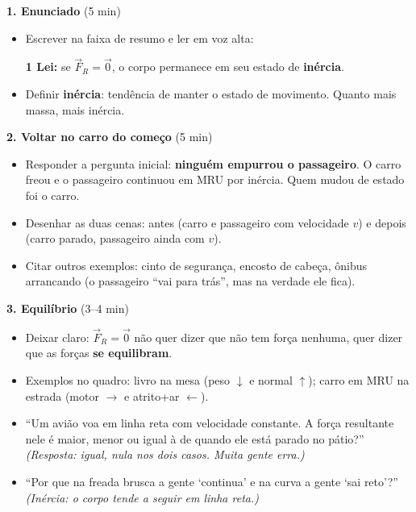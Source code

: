 \documentclass[11pt,a4paper]{article}
\begin{document}
\begin{quadro}
\textbf{1. Enunciado} (5 min)
\begin{itemize}[nosep]
  \item Escrever na faixa de resumo e ler em voz alta:
  \begin{center}
    \textbf{1\textordfeminine{} Lei:} se $\vec{F}_R = \vec{0}$, o corpo
    permanece em seu estado de \textbf{inércia}.
  \end{center}
  \item Definir \textbf{in\'ercia}: tend\^encia de manter o estado de
        movimento. Quanto mais massa, mais in\'ercia.
\end{itemize}

\medskip
\textbf{2. Voltar no carro do come\c{c}o} (5 min)
\begin{itemize}[nosep]
  \item Responder a pergunta inicial: \textbf{ningu\'em empurrou o
        passageiro}. O carro freou e o passageiro continuou em MRU por
        in\'ercia. Quem mudou de estado foi o carro.
  \item Desenhar as duas cenas: antes (carro e passageiro com
        velocidade $v$) e depois (carro parado, passageiro ainda com
        $v$).
  \item Citar outros exemplos: cinto de seguran\c{c}a, encosto de
        cabe\c{c}a, \^onibus arrancando (o passageiro ``vai para
        tr\'as'', mas na verdade ele fica).
\end{itemize}

\medskip
\textbf{3. Equil\'ibrio} (3--4 min)
\begin{itemize}[nosep]
  \item Deixar claro: $\vec{F}_R = \vec{0}$ n\~ao quer dizer que n\~ao
        tem for\c{c}a nenhuma, quer dizer que as for\c{c}as
        \textbf{se equilibram}.
  \item Exemplos no quadro: livro na mesa (peso $\downarrow$ e
        normal $\uparrow$); carro em MRU na estrada
        (motor $\rightarrow$ e atrito+ar $\leftarrow$).
\end{itemize}
\end{quadro}

\begin{perguntas}
\begin{itemize}[nosep]
  \item ``Um avi\~ao voa em linha reta com velocidade constante. A
        for\c{c}a resultante nele \'e maior, menor ou igual \`a de
        quando ele est\'a parado no p\'atio?''
        \textit{(Resposta: igual, nula nos dois casos. Muita gente
        erra.)}
  \item ``Por que na freada brusca a gente `continua' e na curva a
        gente `sai reto'?''
        \textit{(In\'ercia: o corpo tende a seguir em linha reta.)}
\end{itemize}
\end{perguntas}
\end{document}
